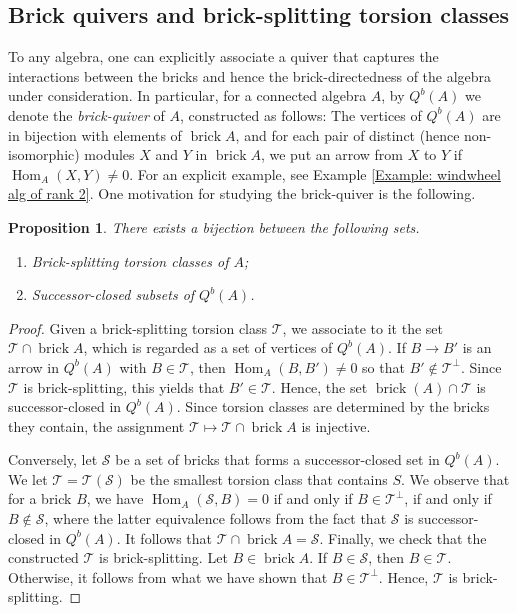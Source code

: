 \documentclass{amsart}
\theoremstyle{thmstyle}
\newtheorem{proposition}[thm]{Proposition}
\theoremstyle{exstyle}
\theoremstyle{defstyle}
\theoremstyle{remstyle}
\theoremstyle{remstyle}
\newcommand{\Hom}{\operatorname{Hom}}
\DeclareMathOperator*{\brick}{brick}
\begin{document}
\subsection{Brick quivers and brick-splitting torsion classes}\label{Subsection: Brick-quiver}

To any algebra, one can explicitly associate a quiver that captures the interactions between the bricks and hence the brick-directedness of the algebra under consideration. In particular, for a connected algebra $A$, by $Q^b(A)$ we denote the \emph{brick-quiver} of $A$, constructed as follows: The vertices of $Q^b(A)$ are in bijection with elements of $\brick A$, and for each pair of distinct (hence non-isomorphic) modules $X$ and $Y$ in $\brick A$, we put an arrow from $X$ to $Y$ if $\Hom_A(X,Y)\neq 0$. For an explicit example, see Example \ref{Example: windwheel alg of rank 2}. One motivation for studying the brick-quiver is the following.

\begin{proposition}
There exists a bijection between the following sets.
\begin{enumerate}
\item Brick-splitting torsion classes of $A$;
\item Successor-closed subsets of $Q^b(A)$.
\end{enumerate}
\end{proposition}


\begin{proof}
Given a brick-splitting torsion class $\mathcal{T}$, we associate to it the set $\mathcal{T} \cap \brick A$, which is regarded as a set of vertices of $Q^b(A)$. If $B \to B'$ is an arrow in $Q^b(A)$ with $B \in \mathcal{T}$, then $\Hom_A(B, B') \ne 0$ so that $B' \not \in \mathcal{T}^\perp$. Since $\mathcal{T}$ is brick-splitting, this yields that $B' \in \mathcal{T}$. Hence, the set $\brick(A) \cap \mathcal{T}$ is successor-closed in $Q^b(A)$. Since torsion classes are determined by the bricks they contain, the assignment $\mathcal{T} \mapsto \mathcal{T} \cap \brick A$ is injective. 

Conversely, let $\mathcal{S}$ be a set of bricks that forms a successor-closed set in $Q^b(A)$. We let $\mathcal{T} = \mathcal{T}(\mathcal{S})$ be the smallest torsion class that contains $S$. We observe that for a brick $B$, we have $\Hom_A(\mathcal{S},B)=0$ if and only if $B \in \mathcal{T}^\perp$, if and only if $B \not \in \mathcal{S}$, where the latter equivalence follows from the fact that $\mathcal{S}$ is successor-closed in $Q^b(A)$. It follows that $\mathcal{T} \cap \brick A = \mathcal{S}$. Finally, we check that the constructed $\mathcal{T}$ is brick-splitting. Let $B \in \brick A$. If $B \in \mathcal{S}$, then $B \in \mathcal{T}$. Otherwise, it follows from what we have shown that $B \in \mathcal{T}^\perp$. Hence, $\mathcal{T}$ is brick-splitting. 
\end{proof}
\end{document}
